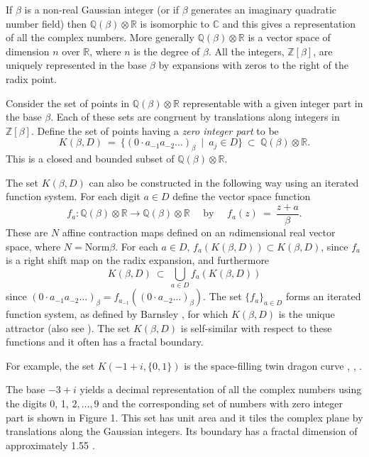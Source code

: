 \documentclass[12pt]{article}
\newcommand{\C}{\mathbb{C}}
\newcommand{\Q}{\mathbb{Q}}
\newcommand{\R}{\mathbb{R}}
\newcommand{\Z}{\mathbb{Z}}
\begin{document}
If $\beta$ is a non-real Gaussian integer (or if $\beta$ generates an imaginary
quadratic number field) then $\Q(\beta)\otimes\R$ is isomorphic to $\C$ and this gives
a representation of all the complex numbers. More generally $\Q(\beta)\otimes\R$ is a vector space of dimension $n$ over $\R$, where $n$ is the degree of $\beta$.
 All the integers, $\Z[\beta]$, are uniquely represented in the base $\beta$ by expansions with zeros to the right of the radix point.

    Consider the set of points in $\Q(\beta)\otimes\R$ representable with a given integer part in the base $\beta$. 
Each of these sets are congruent by translations along
integers in $\Z[\beta]$. 
Define the set of points having a \emph{zero integer part} to be
$$
K(\beta, D) \ =  \ \{(0\cdot a_{-1}a_{-2}\ldots)_{\beta}\ \mid \ a_j\in D\} \ \subset \ \Q(\beta)\otimes\R.
$$
This is a closed and bounded subset of $\Q(\beta)\otimes\R$.

    The set $K(\beta, D)$ can also be constructed in the following way using an
iterated function system.  For each digit $a\in D$ define the vector space
function 
$$
f_a: \Q(\beta)\otimes\R\rightarrow\Q(\beta)\otimes\R\quad\mbox{ by }\quad f_a(z) \ =  \ \frac{z+a}{\beta}.
$$
These are $N$ affine contraction maps defined on an $n$dimensional real vector
space, where $N = \mbox{Norm}{\beta}$. For each $a\in D$,
$f_a(K(\beta, D))\subset K(\beta, D)$, since $f_a$ is a right shift map on the radix expansion, and furthermore
$$
K(\beta, D) \ \subset  \ \bigcup_{a\in D} f_a(K(\beta, D))
$$
since $(0\cdot a_{-1}a_{-2}\ldots)_{\beta}=f_{a_{-1}}((0\cdot a_{-2}\ldots)_{\beta})$. 
The set $\{f_a\}_{a\in D}$ forms an iterated
function system, as defined by Barnsley \cite[\S 3.7]{barnsley}, for which $K(\beta, D)$ is the unique attractor (also see \cite{hutchinson}). 
The set $K(\beta, D)$ is self-similar with respect to these functions and it often has a fractal boundary.

    For example, the set $K(-1 + i, \{0, 1\})$ is the space-filling twin dragon
curve \cite[p. 67]{mandelbrot}, \cite[p. 312]{barnsley}, \cite[\S 4.1]{knuth}.

    The base $-3 + i$ yields a decimal representation of all the complex numbers using the digits 0, 1, $2,\ldots,9$ and the corresponding set of numbers with zero integer part is shown in Figure 1. 
This set has unit area and it tiles the complex plane by translations along the Gaussian integers. 
Its boundary has a fractal dimension of approximately 1.55 \cite{dimension}.
\end{document}
